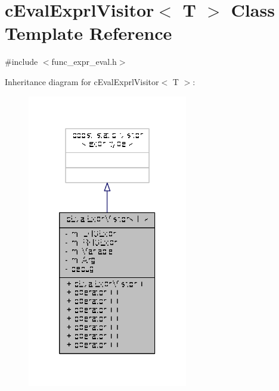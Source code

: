 \hypertarget{classcEvalExprlVisitor}{\section{c\-Eval\-Exprl\-Visitor$<$ T $>$ Class Template Reference}
\label{classcEvalExprlVisitor}
}


{\ttfamily \#include $<$func\-\_\-expr\-\_\-eval.\-h$>$}



Inheritance diagram for c\-Eval\-Exprl\-Visitor$<$ T $>$\-:
\nopagebreak
\begin{figure}[H]
\begin{center}
\leavevmode
\includegraphics[width=198pt]{classcEvalExprlVisitor__inherit__graph}
\end{center}
\end{figure}


